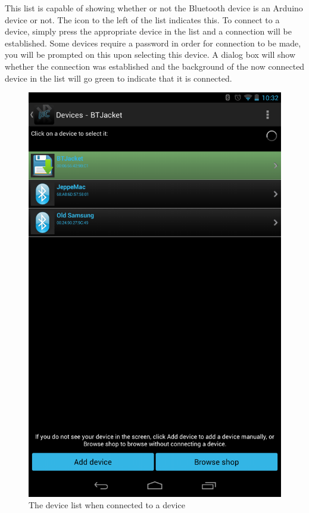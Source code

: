 \newline
This list is capable of showing whether or not the Bluetooth device is an Arduino device or not. The icon to the left of the list indicates this.
To connect to a device, simply press the appropriate device in the list and a connection will be established. Some devices require a password in order for connection to be made, you will be prompted on this upon selecting this device. A dialog box will show whether the connection was established and the background of the now connected device in the list will go green to indicate that it is connected. \\
\newline
\newline
\begin{figure}[H]
	\centering
	\includegraphics[scale = 0.3]{images/Screenshots/connected.png}
	\caption{The device list when connected to a device}
\end{figure}

